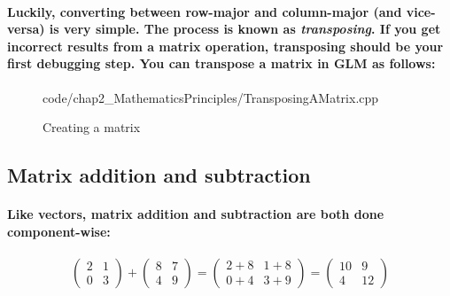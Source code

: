 \paragraph{
    Luckily, converting between row-major and column-major (and vice-versa) is very simple. The process is known as \emph{transposing}. If you get incorrect results from a matrix operation, transposing should be your first debugging step. You can transpose a matrix in GLM as follows:
}

\begin{frame}{}
    \begin{figure}[ht]
    \centering
    \colorbox{backgroundcolor}{
        \parbox{0.9\textwidth}{
            
            {code/chap2_MathematicsPrinciples/TransposingAMatrix.cpp}
        }
    }
    \caption{Creating a matrix}
    \label{fig:creating_a_matrix}
    \end{figure}
\end{frame}

\subsection{Matrix addition and subtraction}
\paragraph{
    Like vectors, matrix addition and subtraction are both done component-wise:
}

\paragraph{
    \begin{equation*}
    \begin{pmatrix}
    2 & 1\\
    0 & 3
    \end{pmatrix} +\begin{pmatrix}
    8 & 7\\
    4 & 9
    \end{pmatrix} =\begin{pmatrix}
    2+8 & 1+8\\
    0+4 & 3+9
    \end{pmatrix} =\begin{pmatrix}
    10 & 9\\
    4 & 12
    \end{pmatrix}
    \end{equation*}
}

